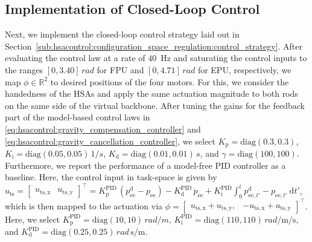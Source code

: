 \subsection{Implementation of Closed-Loop Control}
Next, we implement the closed-loop control strategy laid out in Section~\ref{sub:hsacontrol:configuration_space_regulation:control_strategy}.
After evaluating the control law at a rate of \SI{40}{Hz} and saturating the control inputs to the ranges $[0, 3.40] \, \si{rad}$ for FPU and $[0, 4.71] \, \si{rad}$ for EPU, respectively, we map $\phi \in \mathbb{R}^2$ to desired positions of the four motors. For this, we consider the handedness of the \glspl{HSA} and apply the same actuation magnitude to both rods on the same side of the virtual backbone.
After tuning the gains for the feedback part of the model-based control laws in \eqref{eq:hsacontrol:gravity_compensation_controller} and \eqref{eq:hsacontrol:gravity_cancellation_controller}, we select $K_\mathrm{p} = \mathrm{diag}(0.3, 0.3)$, $K_\mathrm{i} = \mathrm{diag}(0.05, 0.05) \, \si{1 \per s}$, $K_\mathrm{d} = \mathrm{diag}(0.01, 0.01) \, \si{s}$, and $\gamma = \mathrm{diag}(100, 100)$. 
Furthermore, we report the performance of a model-free PID controller as a baseline. Here, the control input in task-space is given by $u_\mathrm{ts} = \begin{bmatrix}u_\mathrm{ts,x} & u_\mathrm{ts,y}\end{bmatrix}^\top = K_\mathrm{p}^\mathrm{PID} \, (p_\mathrm{ee}^\mathrm{d}-p_\mathrm{ee}) - K_\mathrm{d}^\mathrm{PID} \, \dot{p}_\mathrm{ee} + K_\mathrm{i}^\mathrm{PID} \int_0^t p_{\mathrm{ee},t'}^\mathrm{d} - p_{\mathrm{ee},t'} \: \mathrm{d}t'$, which is then mapped to the actuation via $\phi = \begin{bmatrix}
    u_\mathrm{ts,x}+u_\mathrm{ts,y}, & -u_\mathrm{ts,x}+u_\mathrm{ts,y}
\end{bmatrix}^\top$.
Here, we select $K_\mathrm{p}^\mathrm{PID} = \mathrm{diag}(10, 10) \, \si{rad \per m}$, $ K_\mathrm{i}^\mathrm{PID} = \mathrm{diag}(110, 110) \, \si{rad \per \meter \per \second}$, and $ K_\mathrm{d}^\mathrm{PID} = \mathrm{diag}(0.25, 0.25) \, \si{rad \, \second \per \meter}$.
\\

